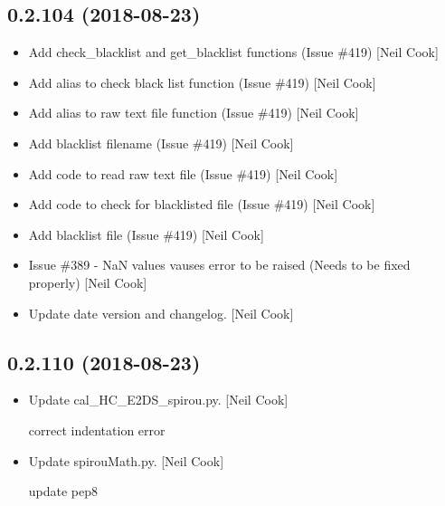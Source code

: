 \documentclass[a4paper,10pt,english]{report}
\begin{document}
\subsection{0.2.104 (2018-08-23)}
\label{\detokenize{misc/changelog:id353}}\begin{itemize}
\item {} 
Add check\_blacklist and get\_blacklist functions (Issue \#419) {[}Neil
Cook{]}

\item {} 
Add alias to check black list function (Issue \#419) {[}Neil Cook{]}

\item {} 
Add alias to raw text file function (Issue \#419) {[}Neil Cook{]}

\item {} 
Add blacklist filename (Issue \#419) {[}Neil Cook{]}

\item {} 
Add code to read raw text file (Issue \#419) {[}Neil Cook{]}

\item {} 
Add code to check for blacklisted file (Issue \#419) {[}Neil Cook{]}

\item {} 
Add blacklist file (Issue \#419) {[}Neil Cook{]}

\item {} 
Issue \#389 - NaN values vauses error to be raised (Needs to be fixed
properly) {[}Neil Cook{]}

\item {} 
Update date version and changelog. {[}Neil Cook{]}

\end{itemize}


\subsection{0.2.110 (2018-08-23)}
\label{\detokenize{misc/changelog:id354}}\begin{itemize}
\item {} 
Update cal\_HC\_E2DS\_spirou.py. {[}Neil Cook{]}

correct indentation error

\item {} 
Update spirouMath.py. {[}Neil Cook{]}

update pep8

\end{itemize}
\end{document}
